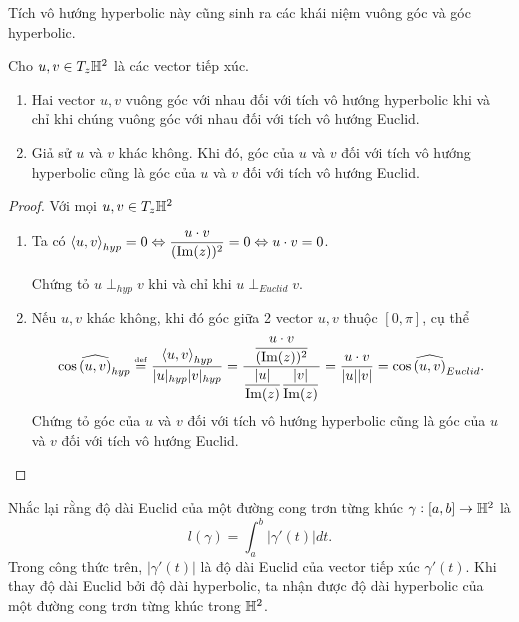 Tích vô hướng hyperbolic này cũng sinh ra các khái niệm vuông góc và góc hyperbolic.
\begin{prop}
    Cho $u,v \in T_z\mathbb{H}^2$ là các vector tiếp xúc.
    \begin{enumerate}
        \item Hai vector $u,v$ vuông góc với nhau đối với tích vô hướng hyperbolic khi và chỉ khi chúng vuông góc với nhau đối với tích vô hướng Euclid.
        \item Giả sử $u$ và $v$ khác không. Khi đó, góc của $u$ và $v$ đối với tích vô hướng hyperbolic cũng là góc của $u$ và $v$ đối với tích vô hướng Euclid.
    \end{enumerate}
\end{prop}
\begin{proof}
    Với mọi $u,v \in T_z\mathbb{H}^2$
    \begin{enumerate}
        \item Ta có $\left<u,v\right>_{hyp} = 0 \Leftrightarrow \dfrac{u\cdot v}{(\operatorname{Im}(z))^2} = 0 \Leftrightarrow u\cdot v = 0$.
        
        Chứng tỏ $u \perp_{hyp}v $ khi và chỉ khi $u \perp_{Euclid} v$.
        \item Nếu $u,v$ khác không, khi đó góc giữa 2 vector $u,v$ thuộc $[0,\pi]$, cụ thể
        \[\cos\widehat{(u,v)}_{hyp} \overset{\underset{\mathrm{def}}{}}{=} \dfrac{\left<u,v\right>_{hyp}}{|u|_{hyp}|v|_{hyp}} = \dfrac{\dfrac{u\cdot v}{(\operatorname{Im}(z))^2}}{\dfrac{|u|}{\operatorname{Im}(z)}\dfrac{|v|}{\operatorname{Im}(z)}} = \dfrac{u\cdot v}{|u||v|} = \cos\widehat{(u,v)}_{Euclid}.\]
        Chứng tỏ góc của $u$ và $v$ đối với tích vô hướng hyperbolic cũng là góc của $u$ và $v$ đối với tích vô hướng Euclid.
    \end{enumerate}
\end{proof}

Nhắc lại rằng độ dài Euclid của một đường cong trơn từng khúc $\gamma: [a,b]\to \mathbb{H}^2$ là 
\[l(\gamma) = \int_{a}^{b}|\gamma'(t)|dt.\]
Trong công thức trên, $|\gamma'(t)|$ là độ dài Euclid của vector tiếp xúc $\gamma'(t)$. Khi thay độ dài Euclid bởi độ dài hyperbolic, ta nhận được độ dài hyperbolic của một đường cong trơn từng khúc trong $\mathbb{H}^2$.


